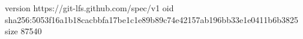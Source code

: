 version https://git-lfs.github.com/spec/v1
oid sha256:5053f16a1b18cacbbfa17be1c1e89b89c74e42157ab196bb33e1e0411b6b3825
size 87540
